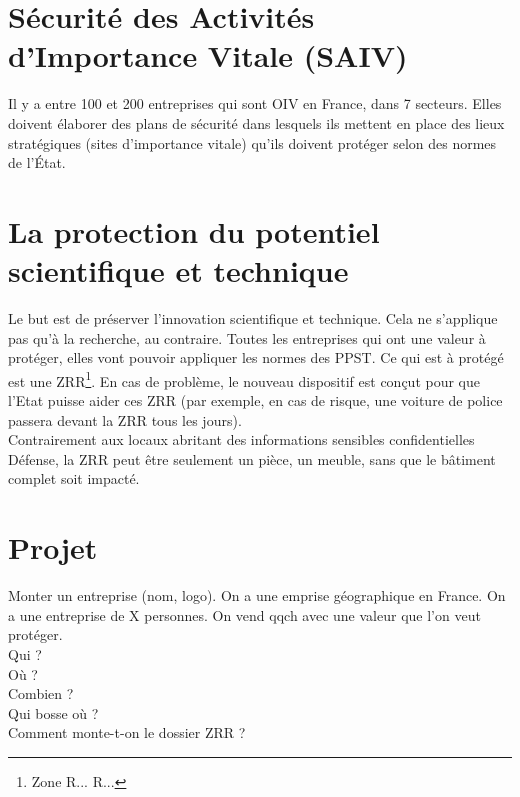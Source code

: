 \section{Sécurité des Activités d'Importance Vitale (SAIV)}
Il y a entre 100 et 200 entreprises qui sont OIV en France, dans 7 secteurs. Elles doivent élaborer des plans de sécurité dans lesquels ils mettent en place des lieux stratégiques (sites d'importance vitale) qu'ils doivent protéger selon des normes de l’État.
\section{La protection du potentiel scientifique et technique}
Le but est de préserver l'innovation scientifique et technique. Cela ne s'applique pas qu'à la recherche, au contraire. Toutes les entreprises qui ont une valeur à protéger, elles vont pouvoir appliquer les normes des PPST. Ce qui est à protégé est une ZRR\footnote{Zone R... R...}. En cas de problème, le nouveau dispositif est conçut pour que l'Etat puisse aider ces ZRR (par exemple, en cas de risque, une voiture de police passera devant la ZRR tous les jours).\\
Contrairement aux locaux abritant des informations sensibles confidentielles Défense, la ZRR peut être seulement un pièce, un meuble, sans que le bâtiment complet soit impacté.
\section{Projet}
Monter un entreprise (nom, logo). On a une emprise géographique en France. On a une entreprise de X personnes. On vend qqch avec une valeur que l'on veut protéger.\\
Qui ?\\
Où ?\\
Combien ?\\
Qui bosse où ?\\
Comment monte-t-on le dossier ZRR ?